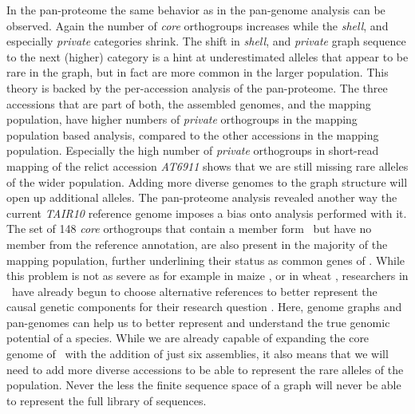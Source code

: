In the pan-proteome the same behavior as in the pan-genome analysis can be observed. Again the number of \textit{core} orthogroups increases while the \textit{shell}, and especially \textit{private} categories shrink. The shift in \textit{shell}, and \textit{private} graph sequence to the next (higher) category is a hint at underestimated alleles that appear to be rare in the graph, but in fact are more common in the larger population. This theory is backed by the per-accession analysis of the pan-proteome. The three accessions that are part of both, the assembled genomes, and the mapping population, have higher numbers of \textit{private} orthogroups in the mapping population based analysis, compared to the other accessions in the mapping population. Especially the high number of \textit{private} orthogroups in short-read mapping of the relict accession \textit{AT6911} shows that we are still missing rare alleles of the wider population. Adding more diverse genomes to the graph structure will open up additional alleles. The pan-proteome analysis revealed another way the current \textit{TAIR10} reference genome imposes a bias onto analysis performed with it. The set of 148 \textit{core} orthogroups that contain a member form \ara\, but have no member from the reference annotation, are also present in the majority of the mapping population, further underlining their status as common genes of \ath. While this problem is not as severe as for example in maize \citep{Hirsch2014-dm,Lu2015-mm,Hirsch2016-je,Jin2016-cd}, or in wheat \citep{Bayer2022-lg}, researchers in \ath\ have already begun to choose alternative references to better represent the causal genetic components for their research question \citep{Wojtowicz2021-eq}. Here, genome graphs and pan-genomes can help us to better represent and understand the true genomic potential of a species. While we are already capable of expanding the core genome of \ath\ with the addition of just six assemblies, it also means that we will need to add more diverse accessions to be able to represent the rare alleles of the population. Never the less the finite sequence space of a graph will never be able to represent the full library of sequences. \newline
